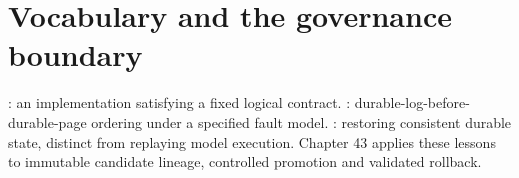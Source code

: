 \section{Vocabulary and the governance boundary}
: an implementation satisfying a fixed logical
contract. : durable-log-before-durable-page ordering under a specified
fault model. : restoring consistent durable state, distinct from
replaying model execution. Chapter 43 applies these lessons to immutable
candidate lineage, controlled promotion and validated rollback.
